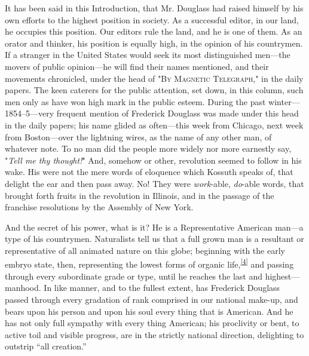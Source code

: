 It has been said in this Introduction, that Mr. Douglass had raised
himself by his own efforts to the highest position in society. As a
successful editor, in our land, he occupies this position. Our editors
rule the land, and he is one of them. As an orator and thinker, his
position is equally high, in the opinion of his countrymen. If a
stranger in the United States would seek its most distinguished
men---the movers of public opinion---he will find their names mentioned,
and their movements chronicled, under the head of "\textsc{By Magnetic
Telegraph}," in the daily papers. The keen caterers for the public
attention, set down, in this column, such men only as have won high mark
in the public esteem. During the past winter---1854--5---very frequent
mention of Frederick Douglass was made under this head in the daily
papers; his name glided as often---this week from Chicago, next week
from Boston---over the lightning wires, as the name of any other man, of
whatever note. To no man did the people more widely nor more earnestly
say, "\emph{Tell me thy thought!}" And, somehow or other, revolution
seemed to follow in his wake. His were not the mere words of eloquence
which Kossuth speaks of, that delight the ear and then pass away. No!
They were \emph{work}-able, \emph{do}-able words, that brought forth
fruits in the revolution in Illinois, and in the passage of the
franchise resolutions by the Assembly of New York.

And the secret of his power, what is it? He is a Representative American
man---a type of his countrymen. Naturalists tell us that a full grown
man is a resultant or representative of all animated nature on this
globe; beginning with the early embryo state, then, {}representing the
lowest forms of organic
life,\textsuperscript{\protect\hyperlink{cite_note-4}{{[}4{]}}} and
passing through every subordinate grade or type, until he reaches the
last and highest---manhood. In like manner, and to the fullest extent,
has Frederick Douglass passed through every gradation of rank comprised
in our national make-up, and bears upon his person and upon his soul
every thing that is American. And he has not only full sympathy with
every thing American; his proclivity or bent, to active toil and visible
progress, are in the strictly national direction, delighting to outstrip
``all creation.''

